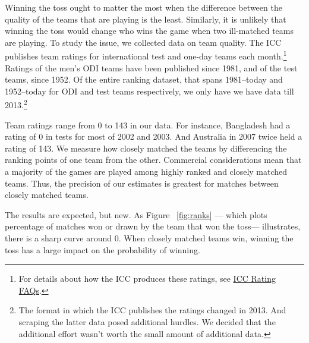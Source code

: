 \documentclass[12pt]{article}
\begin{document}
Winning the toss ought to matter the most when the difference between the quality of the teams that are playing is the least. Similarly, it is unlikely that winning the toss would change who wins the game when two ill-matched teams are playing. To study the issue, we collected data on team quality. The ICC publishes team ratings for international test and one-day teams each month.\footnote{For details about how the ICC produces these ratings, see \href{http://icc-live.s3.amazonaws.com/cms/media/about_docs/536b1a48c16e5-Reliance\%20ICC\%20ODI\%20Team\%20Rankings\%20FAQs\%202014.pdf}{ICC Rating FAQs}.} Ratings of the men's ODI teams have been published since 1981, and of the test teams, since 1952. Of the entire ranking dataset, that spans 1981--today and 1952--today for ODI and test teams respectively, we only have we have data till 2013.\footnote{The format in which the ICC publishes the ratings changed in 2013. And scraping the latter data posed additional hurdles. We decided that the additional effort wasn't worth the small amount of additional data.} 

Team ratings range from 0 to 143 in our data. For instance, Bangladesh had a rating of 0 in tests for most of 2002 and 2003. And Australia in 2007 twice held a rating of 143. We measure how closely matched the teams by differencing the ranking points of one team from the other. Commercial considerations mean that a majority of the games are played among highly ranked and closely matched teams. Thus, the precision of our estimates is greatest for matches between closely matched teams.

The results are expected, but new. As Figure ~\ref{fig:ranks} --- which plots percentage of matches won or drawn by the team that won the toss--- illustrates, there is a sharp curve around 0. When closely matched teams win, winning the toss has a large impact on the probability of winning. 
\end{document}
